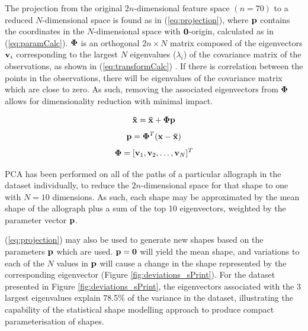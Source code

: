 \documentclass{sig-alternate}
\begin{document}
The projection from the original $2n$-dimensional feature space $(n=70)$ to a reduced
$N$-dimensional space is found as in (\ref{eq:projection}), where ${\bf p}$
contains the coordinates in the $N$-dimensional space with ${\bf 0}$-origin,
calculated as in (\ref{eq:paramCalc}). 
${\bf \Phi }$ is
an orthogonal $2n\times N$ matrix composed of the eigenvectors ${\bf v}_i$ corresponding to
the largest $N$ eigenvalues ($\lambda_i$) of the covariance matrix of the
observations, as shown in (\ref{eq:transformCalc}) \cite{Stegmann2002}. 
If there is correlation between the points in the observations, there will be
eigenvalues of the covariance matrix which are close to zero. As such, removing
the associated eigenvectors from ${\bf \Phi}$ allows for dimensionality
reduction with minimal impact.


\begin{equation}\label{eq:projection}
{\bf \tilde{x}=\bar{x}+\Phi p}
\end{equation}
\begin{equation}\label{eq:paramCalc}
{\bf p} ={\bf \Phi}^T ({\bf {x}-\bar{x}})
\end{equation}
\begin{equation}\label{eq:transformCalc}
{\bf \Phi} = [{\bf v}_1, {\bf v}_2, \ldots, {\bf v}_N]^T
\end{equation}

PCA has been performed on all of the paths of a particular allograph in the
dataset individually, to reduce the $2n$-dimensional space for that shape to one 
with $N=10$ dimensions.
As such,
each shape may be approximated by the mean shape of the allograph plus a sum of the top 10
eigenvectors, weighted by the parameter vector ${\bf p}$. 
%

(\ref{eq:projection}) may also be used
to generate new shapes based on the parameters ${\bf p}$ which are used. ${\bf
p}={\bf 0}$ will yield the mean shape, and variations to each of the $N$ values
in ${\bf p}$ will cause a change in the shape represented by the corresponding
eigenvector (Figure \ref{fig:deviations_sPrint}). 
For the dataset presented in Figure \ref{fig:deviations_sPrint}, the
eigenvectors associated with the 3 largest eigenvalues explain 78.5\% of the
variance in the dataset, illustrating the capability of the statistical shape
modelling approach to produce compact parameterisation of shapes. 
\end{document}
